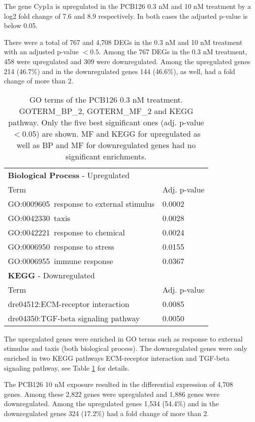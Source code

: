 \documentclass{article}
\begin{document}
The gene Cyp1a is upregulated in the PCB126 0.3 nM and 10 nM treatment
by a log2 fold change of 7.6 and 8.9 respectively. In both cases the
adjusted p-value is below 0.05.

There were a total of 767 and 4,708 DEGs in the 0.3 nM and 10 nM
treatment with an adjusted p-value $<0.5$. Among the 767 DEGs in the
0.3 nM treatment, 458 were upregulated and 309 were
downregulated. Among the upregulated genes 214 (46.7\%) and in the
downregulated genes 144 (46.6\%), as well, had a fold change of more
than 2.

\begin{table}
  \begin{tabular}{ll}
    \hline
    {\bf Biological Process} - Upregulated & \\
    Term & Adj. p-value \\
    \hline
    GO:0009605~response to external stimulus & 0.0002 \\
    GO:0042330~taxis  & 0.0028 \\
    GO:0042221~response to chemical & 0.0024 \\
    GO:0006950~response to stress & 0.0155 \\
    GO:0006955~immune response & 0.0367 \\
    \hline
    {\bf KEGG} - Downregulated \\
    Term & Adj. p-value \\
    \hline
    dre04512:ECM-receptor interaction & 0.0085 \\
    dre04350:TGF-beta signaling pathway & 0.0050 \\    
  \end{tabular}
  \caption{GO terms of the PCB126 0.3 nM treatment. GOTERM\_BP\_2,
    GOTERM\_MF\_2 and KEGG pathway. Only the five best significant
    ones (adj. p-value $<$0.05) are shown. MF and KEGG for upregulated
    as well as BP and MF for downregulated genes had no significant
    enrichments.}
  \label{tab:go-0.3}
\end{table}

The upregulated genes were enriched in GO terms such as response to
external stimulus and taxis (both biological process). The
downregulated genes were only enriched in two KEGG pathways
ECM-receptor interaction and TGF-beta signaling pathway, see Table
\ref{tab:go-0.3} for details.

The PCB126 10 nM exposure resulted in the differential expression of
4,708 genes. Among these 2,822 genes were upregulated and 1,886 genes
were downregulated. Among the upregulated genes 1,534 (54.4\%) and in the
downregulated genes 324 (17.2\%) had a fold change of more than 2.
\end{document}
